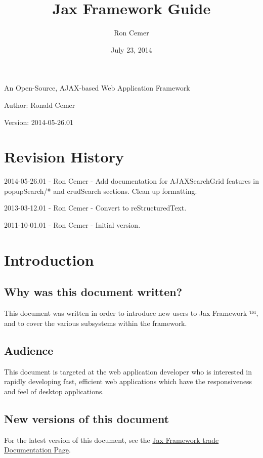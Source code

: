\documentclass[letterpaper,10pt,english]{sphinxmanual}
\title{Jax Framework Guide}
\date{July 23, 2014}
\author{Ron Cemer}
\begin{document}
\maketitle
\tableofcontents
{}\label{jaxFrameworkGuide::doc}


An Open-Source, AJAX-based Web Application Framework

Author: Ronald Cemer

Version: 2014-05-26.01


\chapter{Revision History}
\label{jaxFrameworkGuide:jax-framework-trade}\label{jaxFrameworkGuide:revision-history}
2014-05-26.01 - Ron Cemer - Add documentation for AJAXSearchGrid features in popupSearch/* and crudSearch
sections.  Clean up formatting.

2013-03-12.01 - Ron Cemer - Convert to reStructuredText.

2011-10-01.01 - Ron Cemer - Initial version.


\chapter{Introduction}
\label{jaxFrameworkGuide:introduction}

\section{Why was this document written?}
\label{jaxFrameworkGuide:why-was-this-document-written}
This document was written in order to introduce new users to Jax Framework ™, and to cover the
various subsystems within the framework.


\section{Audience}
\label{jaxFrameworkGuide:audience}
This document is targeted at the web application developer who is interested in rapidly developing
fast, efficient web applications which have the responsiveness and feel of desktop applications.


\section{New versions of this document}
\label{jaxFrameworkGuide:new-versions-of-this-document}
For the latest version of this document, see the \href{http://jaxframework.org}{Jax Framework \textbar{}trade\textbar{} Documentation Page}.
\end{document}
